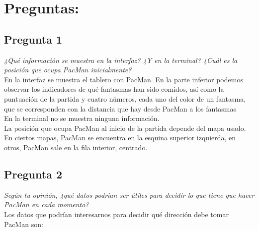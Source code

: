 \documentclass[12pt]{article}
\begin{document}
\tableofcontents

\newpage

\section{Preguntas:}

\subsection{Pregunta 1}

\emph{¿Qué información se muestra en la interfaz? ¿Y en la terminal? ¿Cuál es la
posición que ocupa PacMan inicialmente?}\\

En la interfaz se muestra el tablero con PacMan. En la parte inferior podemos
observar los indicadores de qué fantasmas han sido comidos, así como la
puntuación de la partida y cuatro números, cada uno del color de un fantasma,
que se corresponden con la distancia que hay desde PacMan a los fantasmas\\

En la terminal no se muestra ninguna información.\\

La posición que ocupa PacMan al inicio de la partida depende del mapa usado. En
ciertos mapas, PacMan se encuentra en la esquina superior izquierda, en otros,
PacMan sale en la fila interior, centrado.

\subsection{Pregunta 2}

\emph{Según tu opinión, ¿qué datos podrían ser útiles para decidir lo que tiene
que hacer PacMan en cada momento?}\\

Los datos que podrían interesarnos para decidir qué dirección debe tomar
PacMan son:
\end{document}

